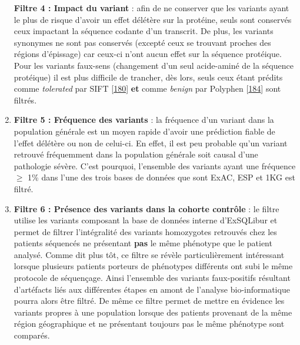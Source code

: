 \documentclass[12pt,a4paper,twoside]{ugathesis}
\theoremstyle{definition}
\theoremstyle{definition}
\theoremstyle{definition}
\theoremstyle{remark}
\begin{document}
\begin{enumerate}
  \textbf{Filtre 4 : Impact du variant} : afin de ne conserver que les
  variants ayant le plus de risque d'avoir un effet délétère sur la
  protéine, seuls sont conservés ceux impactant la séquence codante d'un
  transcrit. De plus, les variants synonymes ne sont pas conservés
  (excepté ceux se trouvant proches des régions d'épissage) car ceux-ci
  n'ont aucun effet sur la séquence protéique. Pour les variants
  faux-sens (changement d'un seul acide-aminé de la séquence protéique)
  il est plus difficile de trancher, dès lors, seuls ceux étant prédits
  comme \emph{tolerated} par SIFT
  {[}\protect\hyperlink{ref-Kumar2009}{180}{]} \textbf{et} comme
  \emph{benign} par Polyphen
  {[}\protect\hyperlink{ref-Adzhubei2010}{184}{]} sont filtrés.
\item
  \textbf{Filtre 5 : Fréquence des variants} : la fréquence d'un variant
  dans la population générale est un moyen rapide d'avoir une prédiction
  fiable de l'effet délétère ou non de celui-ci. En effet, il est peu
  probable qu'un variant retrouvé fréquemment dans la population
  générale soit causal d'une pathologie sévère. C'est pourquoi,
  l'ensemble des variants ayant une fréquence \(\ge\) 1\% dans l'une des
  trois bases de données que sont ExAC, ESP et 1KG est filtré.
\item
  \textbf{Filtre 6 : Présence des variants dans la cohorte contrôle} :
  le filtre utilise les variants composant la base de données interne
  d'ExSQLibur et permet de filtrer l'intégralité des variants
  homozygotes retrouvés chez les patients séquencés ne présentant
  \textbf{pas} le même phénotype que le patient analysé. Comme dit plus
  tôt, ce filtre se révèle particulièrement intéressant lorsque
  plusieurs patients porteurs de phénotypes différents ont subi le même
  protocole de séquençage. Ainsi l'ensemble des variants faux-positifs
  résultant d'artéfacts liés aux différentes étapes en amont de
  l'analyse bio-informatique pourra alors être filtré. De même ce filtre
  permet de mettre en évidence les variants propres à une population
  lorsque des patients provenant de la même région géographique et ne
  présentant toujours pas le même phénotype sont comparés.
\end{enumerate}
\end{document}
